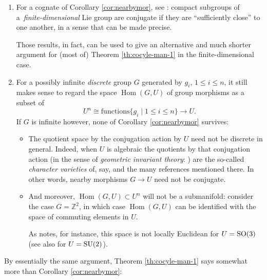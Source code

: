 \documentclass[pdftex]{sigma}
\numberwithin{equation}{section}
\newcommand\bZ{{\mathbb Z}}
\DeclareMathOperator{\Hom}{\mathrm{Hom}}
\begin{document}
\begin{Remarks}\label{res:mz}\quad
 \begin{enumerate}[(1)]\itemsep=0pt

 \item\label{item:remz} For a cognate of Corollary \ref{cor:nearbymor}, see \cite[Theorem 1 and Corollary]{mz-conj}: compact subgroups of a~{\it finite-dimensional} Lie group are conjugate if they are ``sufficiently close'' to one another, in a sense that can be made precise.

 Those results, in fact, can be used to give an alternative and much shorter argument for (most of) Theorem \ref{th:cocyle-man-1} in the finite-dimensional case.

 \item For a possibly infinite {\it discrete} group $G$ generated by $g_i$, $1\le i\le n$, it still makes sense to regard the space $\Hom(G,U)$ of group morphisms as a subset of
 \begin{equation*}
 U^n\cong \mathrm{functions} \{g_i\mid 1\le i\le n\}\to U.
 \end{equation*}
 If $G$ is infinite however, none of Corollary \ref{cor:nearbymor} survives:
 \begin{itemize}\itemsep=0pt
 \item The quotient space by the conjugation action by $U$ need not be discrete in general. Indeed, when $U$ is algebraic the quotients by that conjugation action (in the sense of {\it geometric invariant theory}: \cite[Chapter 1, Section~4]{fkm}) are the so-called {\it character varieties} of, say, \cite[Introduction]{ls} and the many references mentioned there. In other words, nearby morphisms $G\to U$ need not be conjugate.
 \item And moreover, $\Hom(G,U)\subset U^n$ will not be a submanifold: consider the case $G=\bZ^2$, in which case $\Hom(G,U)$ can be identified with the space of commuting elements in $U$.

 As \cite[paragraph following the proof of Theorem 3.1]{gs} notes, for instance, this space is not locally Euclidean for $U={\rm SO}(3)$ (see also \cite[p.~739]{baird} for $U={\rm SU}(2)$).
 \end{itemize}
 \end{enumerate}
\end{Remarks}

By essentially the same argument, Theorem \ref{th:cocyle-man-1} says somewhat more than Corollary \ref{cor:nearbymor}:
\end{document}
